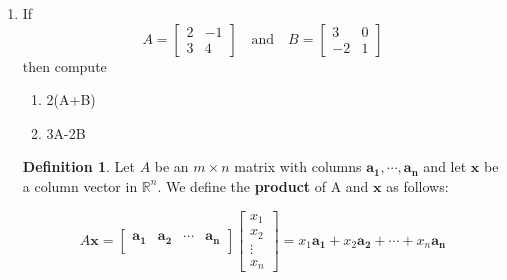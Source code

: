 \documentclass[12pt]{amsart}
\theoremstyle{definition}
\newtheorem*{definition}{Definition}
\newtheorem{theorem}{Theorem}
\begin{document}
\begin{enumerate}[itemsep=0.8em,leftmargin=0pt]
\begin{theorem}[Properties of Scalar Multiplication]
\end{theorem}


\item If 
$$A=\begin{bmatrix}2&-1\\3&4\end{bmatrix}\quad\text{and}\quad B=\begin{bmatrix}3&0\\-2&1\end{bmatrix}$$
then compute 
\begin{enumerate}
    \item 2(A+B)
    \item 3A-2B
\end{enumerate}


\begin{definition} 
    Let $A$ be an $m \times n$ matrix with columns $\mathbf{a_{1}}, \cdots , \mathbf{a_{n}}$ and let $\mathbf{x}$ be a column vector in $\mathbb{R}^{n}$. We define the \textbf{product} of A and $\mathbf{x}$ as follows:
    
    \[A \mathbf{x} = 
    \begin{bmatrix}
    \mathbf{a_{1}} & \mathbf{a_{2}} & \cdots & \mathbf{a_{n}}\\
    \end{bmatrix}
     \begin{bmatrix}
    x_{1} \\
    x_{2} \\
    \vdots \\ 
    x_{n}
    \end{bmatrix}
    = x_{1}\mathbf{a_{1}}+ x_{2}\mathbf{a_{2}} + \cdots+ x_{n}\mathbf{a_{n}}
    \]
\end{definition}



\end{enumerate}
\end{document}
